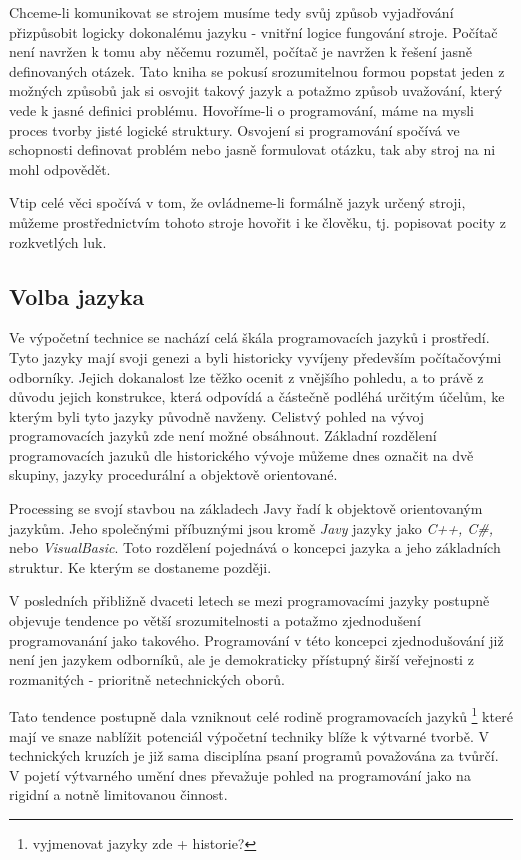 \documentclass[11pt]{article}
\begin{document}
Chceme-li komunikovat se strojem musíme tedy svůj způsob vyjadřování přizpůsobit logicky dokonalému jazyku - vnitřní logice fungování stroje. Počítač není navržen k tomu aby něčemu rozuměl, počítač je navržen k řešení jasně definovaných otázek. Tato kniha se pokusí srozumitelnou formou popstat jeden z možných způsobů jak si osvojit takový jazyk a potažmo způsob uvažování, který vede k jasné definici problému. Hovoříme-li o programování, máme na mysli proces tvorby jisté logické struktury. Osvojení si programování spočívá ve schopnosti definovat problém nebo jasně formulovat otázku, tak aby stroj na ni mohl odpovědět.

Vtip celé věci spočívá v tom, že ovládneme-li formálně jazyk určený stroji, můžeme prostřednictvím tohoto stroje hovořit i ke člověku, tj. popisovat pocity z rozkvetlých luk.

\subsection{Volba jazyka}


Ve výpočetní technice se nachází celá škála programovacích jazyků i prostředí. Tyto jazyky mají svoji genezi a byli historicky vyvíjeny především počítačovými odborníky. Jejich dokanalost lze těžko ocenit z vnějšího pohledu, a to právě z důvodu jejich konstrukce, která odpovídá a částečně podléhá určitým účelům, ke kterým byli tyto jazyky původně navženy. Celistvý pohled na vývoj programovacích jazyků zde není možné obsáhnout. Základní rozdělení programovacích jazuků dle historického vývoje můžeme dnes označit na dvě skupiny, jazyky procedurální a objektově orientované.

Processing se svojí stavbou na základech Javy řadí k objektově orientovaným jazykům. Jeho společnými příbuznými jsou kromě {\em Javy} jazyky jako {\em C++, C\#,} nebo {\em VisualBasic}. Toto rozdělení pojednává o koncepci jazyka a jeho základních struktur. Ke kterým se dostaneme později. 

V posledních přibližně dvaceti letech se mezi programovacími jazyky postupně objevuje tendence po větší srozumitelnosti a potažmo zjednodušení programovanání jako takového. Programování v této koncepci zjednodušování již není jen jazykem odborníků, ale je demokraticky přístupný širší veřejnosti z rozmanitých - prioritně netechnických oborů.

Tato tendence postupně dala vzniknout celé rodině programovacích jazyků
\footnote{vyjmenovat jazyky zde + historie?}
které mají ve snaze nablížit potenciál výpočetní techniky blíže k výtvarné tvorbě. V technických kruzích je již sama disciplína psaní programů považována za tvůrčí. V pojetí výtvarného umění dnes převažuje pohled na programování jako na rigidní a notně limitovanou činnost.
\end{document}
